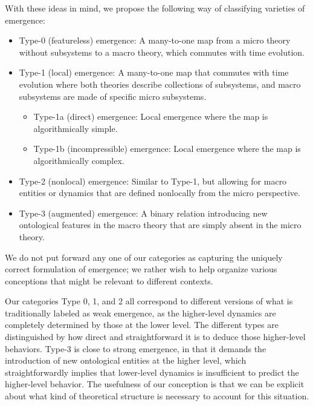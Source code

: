 \documentclass[12pt,english]{article}
\begin{document}
With these ideas in mind, we propose the following way of classifying varieties of emergence:
\begin{itemize}
    \item {Type-0 (featureless) emergence:} A many-to-one map from a micro theory without subsystems to a macro theory, which commutes with time evolution.
    \item {Type-1 (local) emergence:} A many-to-one map that commutes with time evolution where both theories describe collections of subsystems, and macro subsystems are made of specific micro subsystems.
    \begin{itemize}
    \item {Type-1a (direct) emergence:} Local emergence where the map is algorithmically simple.
    \item {Type-1b (incompressible) emergence:} Local emergence where the map is algorithmically complex.
    \end{itemize}
    \item {Type-2 (nonlocal) emergence:} Similar to Type-1, but allowing for macro entities or dynamics that are defined nonlocally from the micro perspective.
    \item {Type-3 (augmented) emergence:} A binary relation introducing new ontological features in the macro theory that are simply absent in the micro theory.
\end{itemize}
We do not put forward any one of our categories as capturing the uniquely correct formulation of emergence; we rather wish to help organize various conceptions that might be relevant to different contexts.

Our categories Type 0, 1, and 2 all correspond to different versions of what is traditionally labeled as weak emergence, as the higher-level dynamics are completely determined by those at the lower level.
The different types are distinguished by how direct and straightforward it is to deduce those higher-level behaviors.
Type-3 is close to strong emergence, in that it demands the introduction of new ontological entities at the higher level, which straightforwardly implies that lower-level dynamics is insufficient to predict the higher-level behavior.
The usefulness of our conception is that we can be explicit about what kind of theoretical structure is necessary to account for this situation.
\end{document}
